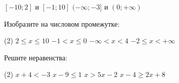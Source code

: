 \begin{consultation}[number=1]
\begin{listofex}
\begin{tasks}
			\task \( [-10;2] \) и \( [-1;10] \)
			\task \( (-\infty;-3] \) и \( (0;+\infty) \)
		\end{tasks}
		\item Изобразите на числовом промежутке:
		\begin{tasks}(2)
			\task \( 2\leq x\leq 10\)
			\task \( -1< x\leq 0\)
			\task \( -\infty < x< 4\)
			\task \( -2\leq x<+\infty \)
		\end{tasks}
		\item Решите неравенства:
		\begin{tasks}(2)
			\task \( x+4<-3 \)
			\task \( x-9\leq 1 \)
			\task \( x>5x-2\)
			\task \( x-4\geq 2x+8\)
		\end{tasks}
	\end{listofex}
\end{consultation}
